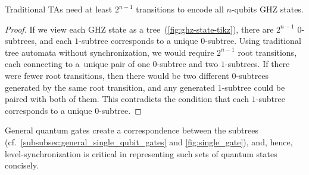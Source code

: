 \begin{theorem}[Succinctness]\label{lem:ta_succinct}
    Traditional TAs need at least $2^{n-1}$ transitions to encode all $n$-qubits GHZ states.
\end{theorem}
\begin{proof}
If we view each GHZ state as a tree~(\cref{fig:ghz-state-tikz}), 
there are $2^{n-1}$ $0$-subtrees, and each $1$-subtree corresponds to a unique $0$-subtree.
Using traditional tree automata without synchronization, we would require $2^{n-1}$
root transitions, each connecting to a~unique pair of one $0$-subtree and two $1$-subtrees.
If there were fewer root transitions, then there would be two different
$0$-subtrees generated by the same root transition, and any generated
$1$-subtree could be paired with both of them.
This contradicts the condition that each $1$-subtree corresponds to a unique $0$-subtree.
\end{proof}
General quantum gates create a correspondence between the subtrees
(cf.~\cref{subsubsec:general_single_qubit_gates} and \cref{fig:single_gate}),
and, hence, level-synchronization is critical in representing such
sets of quantum states concisely.

